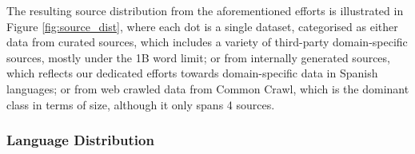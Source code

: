 The resulting source distribution from the aforementioned efforts is illustrated in Figure \ref{fig:source_dist}, where each dot is a single dataset, categorised as either data from curated sources, which includes a variety of third-party domain-specific sources, mostly under the 1B word limit; or from internally generated sources, which reflects our dedicated efforts towards domain-specific data in Spanish languages; or from web crawled data from Common Crawl, which is the dominant class in terms of size, although it only spans 4 sources.

\subsubsection{Language Distribution}
\label{subsubsec:language-distribution}


